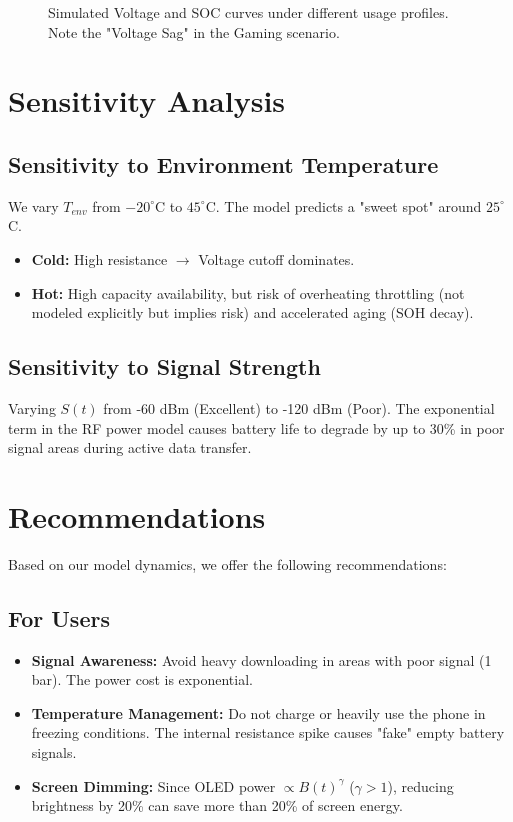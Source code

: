 \documentclass[12pt]{article}
\begin{document}
\begin{figure}[H]
    \centering
    \caption{Simulated Voltage and SOC curves under different usage profiles. Note the "Voltage Sag" in the Gaming scenario.}
    \label{fig:results}
\end{figure}

\section{Sensitivity Analysis}

\subsection{Sensitivity to Environment Temperature}
We vary $T_{env}$ from $-20^{\circ}$C to $45^{\circ}$C. The model predicts a "sweet spot" around $25^{\circ}$C.
\begin{itemize}
    \item \textbf{Cold:} High resistance $\to$ Voltage cutoff dominates.
    \item \textbf{Hot:} High capacity availability, but risk of overheating throttling (not modeled explicitly but implies risk) and accelerated aging (SOH decay).
\end{itemize}

\subsection{Sensitivity to Signal Strength}
Varying $S(t)$ from -60 dBm (Excellent) to -120 dBm (Poor). The exponential term in the RF power model causes battery life to degrade by up to 30\% in poor signal areas during active data transfer.

\section{Recommendations}

Based on our model dynamics, we offer the following recommendations:

\subsection{For Users}
\begin{itemize}
    \item \textbf{Signal Awareness:} Avoid heavy downloading in areas with poor signal (1 bar). The power cost is exponential.
    \item \textbf{Temperature Management:} Do not charge or heavily use the phone in freezing conditions. The internal resistance spike causes "fake" empty battery signals.
    \item \textbf{Screen Dimming:} Since OLED power $\propto B(t)^{\gamma}$ ($\gamma > 1$), reducing brightness by 20\% can save more than 20\% of screen energy.
\end{itemize}
\end{document}
